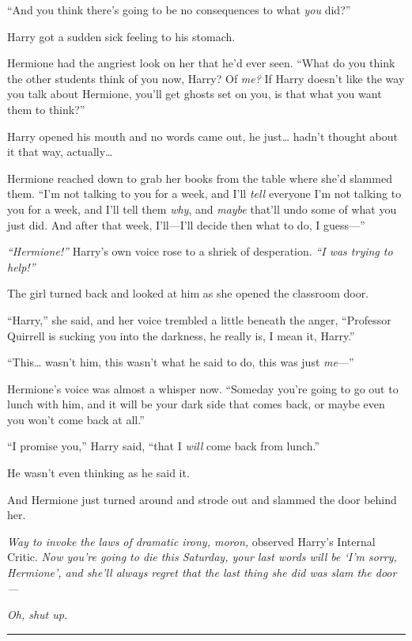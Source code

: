 ``And you think there's going to be no consequences to what \emph{you}
did?''

Harry got a sudden sick feeling to his stomach.

Hermione had the angriest look on her that he'd ever seen. ``What do you
think the other students think of you now, Harry? Of \emph{me?} If Harry
doesn't like the way you talk about Hermione, you'll get ghosts set on
you, is that what you want them to think?''

Harry opened his mouth and no words came out, he just\ldots{} hadn't
thought about it that way, actually\ldots{}

Hermione reached down to grab her books from the table where she'd
slammed them. ``I'm not talking to you for a week, and I'll \emph{tell}
everyone I'm not talking to you for a week, and I'll tell them
\emph{why}, and \emph{maybe} that'll undo some of what you just did. And
after that week, I'll---I'll decide then what to do, I guess---''

\emph{``Hermione!''} Harry's own voice rose to a shriek of desperation.
\emph{``I was trying to help!''}

The girl turned back and looked at him as she opened the classroom door.

``Harry,'' she said, and her voice trembled a little beneath the anger,
``Professor Quirrell is sucking you into the darkness, he really is, I
mean it, Harry.''

``This\ldots{} wasn't him, this wasn't what he said to do, this was just
\emph{me}---''

Hermione's voice was almost a whisper now. ``Someday you're going to go
out to lunch with him, and it will be your dark side that comes back, or
maybe even you won't come back at all.''

``I promise you,'' Harry said, ``that I \emph{will} come back from
lunch.''

He wasn't even thinking as he said it.

And Hermione just turned around and strode out and slammed the door
behind her.

\emph{Way to invoke the laws of dramatic irony, moron,} observed Harry's
Internal Critic. \emph{Now you're going to die this Saturday, your last
words will be `I'm sorry, Hermione', and she'll always regret that the
last thing she did was slam the door---}

\emph{Oh, shut up.}

\begin{center}\rule{3in}{0.4pt}\end{center}

